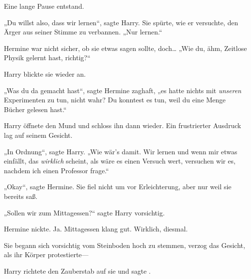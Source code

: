 Eine lange Pause entstand.

„Du willst also, dass wir lernen“, sagte Harry. Sie spürte, wie er versuchte, den Ärger aus seiner Stimme zu verbannen. „Nur lernen.“

Hermine war nicht sicher, ob sie etwas sagen sollte, doch… „Wie du, ähm, Zeitlose Physik gelernt hast, richtig?“

Harry blickte sie wieder an.

„Was du da gemacht hast“, sagte Hermine zaghaft, „es hatte nichts mit \emph{unseren} Experimenten zu tun, nicht wahr? Du konntest es tun, weil du eine Menge Bücher gelesen hast.“

Harry öffnete den Mund und schloss ihn dann wieder. Ein frustrierter Ausdruck lag auf seinem Gesicht.

„In Ordnung“, sagte Harry. „Wie wär’s damit. Wir lernen und wenn mir etwas einfällt, das \emph{wirklich} scheint, als wäre es einen Versuch wert, versuchen wir es, nachdem ich einen Professor frage.“

„Okay“, sagte Hermine. Sie fiel nicht um vor Erleichterung, aber nur weil sie bereits saß.

„Sollen wir zum Mittagessen?“ sagte Harry vorsichtig.

Hermine nickte. Ja. Mittagessen klang gut. Wirklich, diesmal.

Sie begann sich vorsichtig vom Steinboden hoch zu stemmen, verzog das Gesicht, als ihr Körper protestierte—

Harry richtete den Zauberstab auf sie und sagte .

